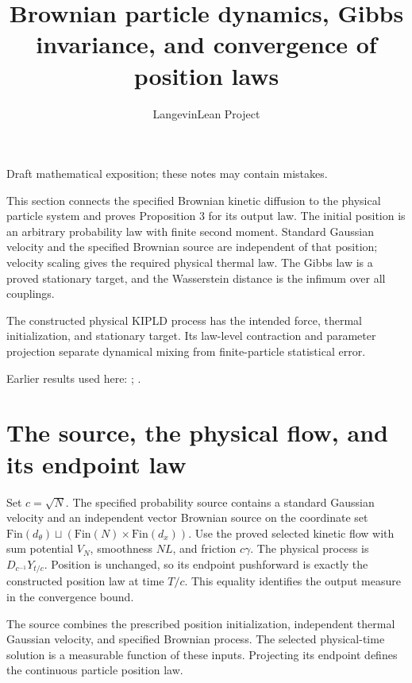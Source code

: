 \documentclass[11pt,a4paper]{article}
\title{\texorpdfstring{Brownian particle dynamics, Gibbs invariance, and convergence of position laws}{Brownian particle dynamics, Gibbs invariance, and convergence of position laws}}
\author{LangevinLean Project}
\date{}
\begin{document}
\maketitle
Draft mathematical exposition; these notes may contain mistakes.


This section connects the specified Brownian kinetic diffusion to the physical particle system and proves Proposition 3 for its output law. The initial position is an arbitrary probability law with finite second moment. Standard Gaussian velocity and the specified Brownian source are independent of that position; velocity scaling gives the required physical thermal law. The Gibbs law is a proved stationary target, and the Wasserstein distance is the infimum over all couplings.



The constructed physical KIPLD process has the intended force, thermal initialization, and stationary target. Its law-level contraction and parameter projection separate dynamical mixing from finite-particle statistical error.



Earlier results used here: \cite[Section~3.58]{LangevinLean2026Kinetic}; \cite[Section~3.115]{LangevinLean2026Kinetic}.

\section{\texorpdfstring{The source, the physical flow, and its endpoint law}{The source, the physical flow, and its endpoint law}}


Set \(c=\sqrt N\). The specified probability source contains a standard Gaussian velocity and an independent vector Brownian source on the coordinate set \(\mathrm{Fin}(d_\theta)\sqcup(\mathrm{Fin}(N)\times\mathrm{Fin}(d_x))\). Use the proved selected kinetic flow with sum potential \(V_N\), smoothness \(NL\), and friction \(c\gamma\). The physical process is \(D_{c^{-1}}Y_{t/c}\). Position is unchanged, so its endpoint pushforward is exactly the constructed position law at time \(T/c\). This equality identifies the output measure in the convergence bound.



The source combines the prescribed position initialization, independent thermal Gaussian velocity, and specified Brownian process. The selected physical-time solution is a measurable function of these inputs. Projecting its endpoint defines the continuous particle position law.
\end{document}
